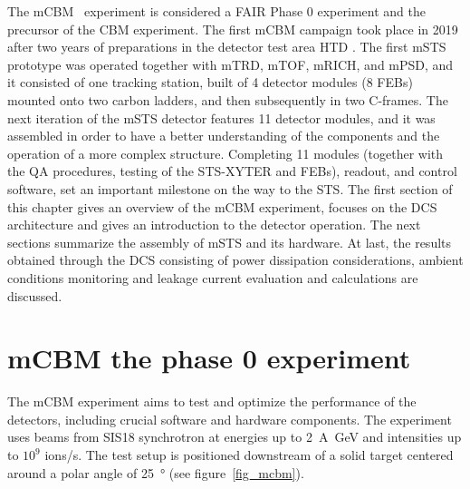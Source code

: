 The mCBM~\cite{mCBM} experiment is considered a \gls{FAIR} Phase \num{0} experiment and the precursor of the \gls{CBM} experiment. The first mCBM campaign took place in \num{2019} after two years of preparations in the detector test area HTD \cite{progress_report_2017_sturm}. The first \gls{mSTS} prototype was operated together with mTRD, mTOF, mRICH, and mPSD, and it consisted of one tracking station, built of \num{4} detector modules (\num{8} \glspl{FEB}) mounted onto two carbon ladders, and then subsequently in two C-frames. The next iteration of the \gls{mSTS} detector features \num{11} detector modules, and it was assembled in order to have a better understanding of the components and the operation of a more complex structure. Completing \num{11} modules (together with the QA procedures, testing of the STS-XYTER and \glspl{FEB}), readout, and control software, set an important milestone on the way to the \gls{STS}. The first section of this chapter gives an overview of the \gls{mCBM} experiment, focuses on the \gls{DCS} architecture and gives an introduction to the detector operation. The next sections summarize the assembly of \gls{mSTS} and its hardware. At last, the results obtained through the \gls{DCS} consisting of power dissipation considerations, ambient conditions monitoring and leakage current evaluation and calculations are discussed.

\section{mCBM the phase 0 experiment}
The \gls{mCBM} experiment aims to test and optimize the performance of the detectors, including crucial software and hardware components. The experiment uses beams from SIS18 synchrotron at energies up to \SI{2}{\A\giga\eV} and intensities up to $10^{9}$ ions/s. The test setup is positioned downstream of a solid target centered around a polar angle of \SI{25}{\degree} (see figure~\ref{fig_mcbm}).

